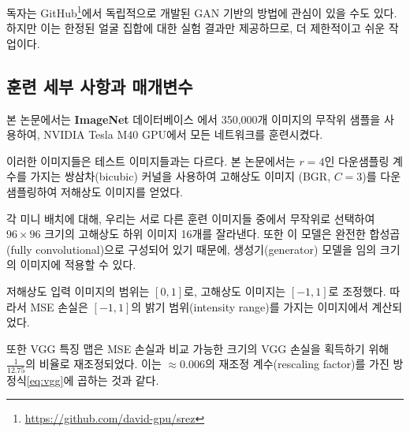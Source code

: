 \documentclass[10pt,twocolumn,letterpaper]{article}
\newcommand{\kor}[1]{#1}
\newcommand{\eng}[1]{}
\begin{document}
\eng{
The reader may also be interested in an independently developed GAN-based solution on GitHub\footnote{\url{https://github.com/david-gpu/srez}}. However it only provides experimental results on a limited set of faces, which is a more constrained and easier task.
}\kor{
독자는 GitHub\footnote{\url{https://github.com/david-gpu/srez}}에서 독립적으로 개발된 GAN 기반의 방법에 관심이 있을 수도 있다. 하지만 이는 한정된 얼굴 집합에 대한 실험 결과만 제공하므로, 더 제한적이고 쉬운 작업이다.
}

\subsection{\eng{Training details and parameters}\kor{훈련 세부 사항과 매개변수}}
\eng{
We trained all networks on a NVIDIA Tesla M40 GPU using a random sample of 350 thousand images from the \textbf{ImageNet} database \cite{russakovsky2014imagenet}.
}\kor{
본 논문에서는 \textbf{ImageNet} 데이터베이스 \cite{russakovsky2014imagenet}에서 350,000개 이미지의 무작위 샘플을 사용하여, NVIDIA Tesla M40 GPU에서 모든 네트워크를 훈련시켰다.
} \eng{
These images are distinct from the testing images. We obtained the \ac{LR} images by downsampling the \ac{HR} images (BGR, $C=3$) using bicubic kernel with downsampling factor $r=4$.
}\kor{
이러한 이미지들은 테스트 이미지들과는 다르다. 본 논문에서는 $r=4$인 다운샘플링 계수를 가지는 쌍삼차(bicubic) 커널을 사용하여 \ac{고해상도} 이미지 (BGR, $C=3$)를 다운샘플링하여 \ac{저해상도} 이미지를 얻었다.
} \eng{
For each mini-batch we crop 16 random $96\times96$ \ac{HR} sub images of distinct training images. Note that we can apply the generator model to images of arbitrary size as it is fully convolutional.
}\kor{
각 미니 배치에 대해, 우리는 서로 다른 훈련 이미지들 중에서 무작위로 선택하여 $96\times96$ 크기의 \ac{고해상도} 하위 이미지 16개를 잘라낸다. 또한 이 모델은 완전한 합성곱(fully convolutional)으로 구성되어 있기 때문에, 생성기(generator) 모델을 임의 크기의 이미지에 적용할 수 있다.
}
\eng{
We scaled the range of the \ac{LR} input images to $[0, 1]$ and for the \ac{HR} images to $[-1, 1]$. The \ac{MSE} loss was thus calculated on images of intensity range $[-1, 1]$.
}\kor{
\ac{저해상도} 입력 이미지의 범위는 $[0, 1]$로, \ac{고해상도} 이미지는 $[-1, 1]$로 조정했다. 따라서 \ac{MSE} 손실은 $[-1, 1]$의 밝기 범위(intensity range)를 가지는 이미지에서 계산되었다.
} \eng{
VGG feature maps were also rescaled by a factor of $\frac{1}{12.75}$ to obtain VGG losses of a scale that is comparable to the \ac{MSE} loss. This is equivalent to multiplying Equation \ref{eq:vgg} with a rescaling factor of $\approx0.006$.
}\kor{
또한 VGG 특징 맵은 \ac{MSE} 손실과 비교 가능한 크기의 VGG 손실을 획득하기 위해 $\frac{1}{12.75}$의 비율로 재조정되었다. 이는 $\approx0.006$의 재조정 계수(rescaling factor)를 가진 방정식\ref{eq:vgg}에 곱하는 것과 같다.
}
\end{document}
